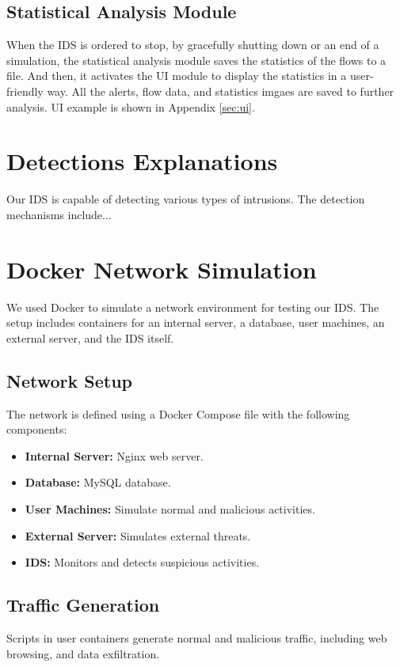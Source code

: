 \documentclass{article}
\begin{document}
\subsection{Statistical Analysis Module}
When the IDS is ordered to stop, by gracefully shutting down or an end of a simulation, the statistical analysis module saves the statistics of the flows to a file.
And then, it activates the UI module to display the statistics in a user-friendly way.
All the alerts, flow data, and statistics imgaes are saved to further analysis.
UI example is shown in Appendix \ref{sec:ui}.

\section{Detections Explanations}
Our IDS is capable of detecting various types of intrusions. The detection mechanisms include...


\section{Docker Network Simulation}
We used Docker to simulate a network environment for testing our IDS. The setup includes containers for an internal server, a database, user machines, an external server, and the IDS itself.

\subsection{Network Setup}
The network is defined using a Docker Compose file with the following components:
\begin{itemize}
    \item \textbf{Internal Server:} Nginx web server.
    \item \textbf{Database:} MySQL database.
    \item \textbf{User Machines:} Simulate normal and malicious activities.
    \item \textbf{External Server:} Simulates external threats.
    \item \textbf{IDS:} Monitors and detects suspicious activities.
\end{itemize}

\subsection{Traffic Generation}
Scripts in user containers generate normal and malicious traffic, including web browsing, and data exfiltration.
\end{document}
